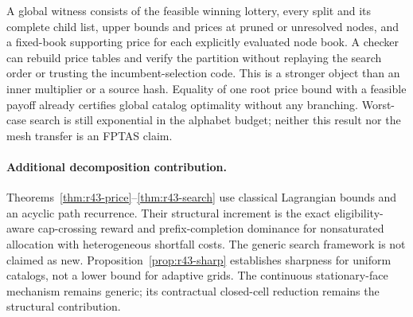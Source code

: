 A global witness consists of the feasible winning lottery, every split and its complete child list, upper bounds and prices at pruned or unresolved nodes, and a fixed-book supporting price for each explicitly evaluated node book. A checker can rebuild price tables and verify the partition without replaying the search order or trusting the incumbent-selection code. This is a stronger object than an inner multiplier or a source hash. Equality of one root price bound with a feasible payoff already certifies global catalog optimality without any branching. Worst-case search is still exponential in the alphabet budget; neither this result nor the mesh transfer is an FPTAS claim.

\paragraph{Additional decomposition contribution.}
Theorems~\ref{thm:r43-price}--\ref{thm:r43-search} use classical Lagrangian bounds and an acyclic path recurrence. Their structural increment is the exact eligibility-aware cap-crossing reward and prefix-completion dominance for nonsaturated allocation with heterogeneous shortfall costs. The generic search framework is not claimed as new. Proposition~\ref{prop:r43-sharp} establishes sharpness for uniform catalogs, not a lower bound for adaptive grids. The continuous stationary-face mechanism remains generic; its contractual closed-cell reduction remains the structural contribution.
